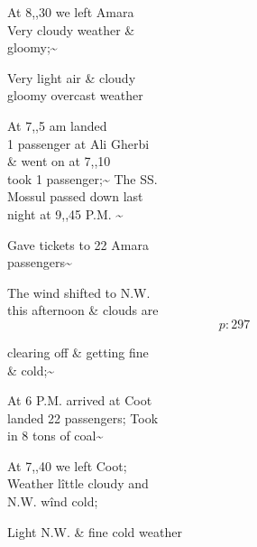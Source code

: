 \documentclass{report}
\begin{document}
	\par{
 	At 8,,30 we left Amara\ \\Very cloudy weather \&\ \\gloomy;\~{}\ \\
	}

	\par{
 	Very light air \& cloudy\ \\gloomy overcast weather\ \\
	}

	\par{
 	At 7,,5 am landed\ \\1 passenger at Ali Gherbi\ \\\& went on at 7,,10\ \\took 1 passenger;\~{} The SS.\ \\Mossul passed down last\ \\night at 9,,45 P.M. \~{}\ \\
	}

	\par{
 	Gave tickets to 22 Amara\ \\passengers\~{}\ \\
	}

	\par{
 	The wind shifted to N.W.\ \\this afternoon \& clouds are\ \\
  \[p: 297 \]

	}



	\par{
 	clearing off \& getting fine\ \\\& cold;\~{}\ \\
	}

	\par{
 	At 6 P.M. arrived at Coot\ \\landed 22 passengers; Took\ \\in 8 tons of coal\~{}\ \\
	}

	\par{
 	At 7,,40 we left Coot;\ \\Weather lîttle cloudy and\ \\N.W. wînd cold;\ \\
	}

	\par{
 	Light N.W. \& fine cold weather\ \\
	}
\end{document}
